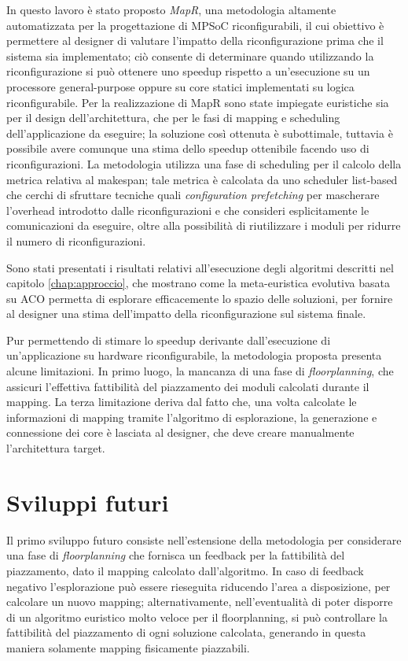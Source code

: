 In questo lavoro \`e stato proposto \emph{MapR}, una metodologia
altamente automatizzata per la progettazione di \acs{MPSoC} riconfigurabili, il cui
obiettivo \`e permettere al designer di valutare l'impatto della riconfigurazione prima che il sistema
sia implementato; ci\`o consente di determinare quando utilizzando la riconfigurazione si pu\`o
ottenere uno speedup rispetto a un'esecuzione su un processore general-purpose oppure
su core statici implementati su logica riconfigurabile.
Per la realizzazione di MapR sono state impiegate euristiche sia per il design dell'architettura, che per
le fasi di mapping e scheduling dell'applicazione da eseguire; la soluzione cos\`i ottenuta \`e
subottimale, tuttavia \`e possibile avere comunque una stima dello speedup ottenibile
facendo uso di riconfigurazioni. La metodologia utilizza una fase di scheduling
per il calcolo della metrica relativa al \mbox{makespan}; 
tale metrica \`e calcolata da uno scheduler list-based che cerchi di sfruttare tecniche quali
\emph{configuration prefetching} per mascherare l'overhead introdotto dalle
riconfigurazioni e che consideri esplicitamente le comunicazioni da eseguire, oltre
alla possibilit\`a di riutilizzare i moduli per ridurre il numero di riconfigurazioni.

Sono stati presentati i risultati relativi all'esecuzione degli algoritmi descritti
nel capitolo \ref{chap:approccio}, che mostrano come la meta-euristica evolutiva basata
su \acl{ACO} permetta di esplorare efficacemente lo spazio delle soluzioni,
per fornire al designer una stima dell'impatto della riconfigurazione sul sistema finale.

Pur permettendo di stimare lo speedup derivante dall'esecuzione di un'applicazione su hardware riconfigurabile,
la metodologia proposta presenta alcune limitazioni. In primo luogo,
la mancanza di una fase di \emph{floorplanning}, che assicuri
l'effettiva fattibilit\`a del piazzamento dei moduli calcolati durante il mapping.
La terza limitazione deriva dal fatto che, una volta calcolate le informazioni di mapping
tramite l'algoritmo di esplorazione, la generazione e connessione dei core \`e lasciata
al designer, che deve creare manualmente l'architettura target.

\section{Sviluppi futuri}
\label{sec:sviluppiFuturi}
Il primo sviluppo futuro consiste nell'estensione della metodologia per considerare una fase di
\emph{floorplanning} che fornisca un feedback per la fattibilit\`a del piazzamento, dato
il mapping calcolato dall'algoritmo. In caso di feedback negativo l'esplorazione pu\`o essere rieseguita
riducendo l'area a disposizione, per calcolare un nuovo mapping; alternativamente, nell'eventualit\`a
di poter disporre di un algoritmo euristico molto veloce per il floorplanning, si pu\`o
controllare la fattibilit\`a del piazzamento di ogni soluzione calcolata, generando in questa maniera
solamente mapping fisicamente piazzabili.

